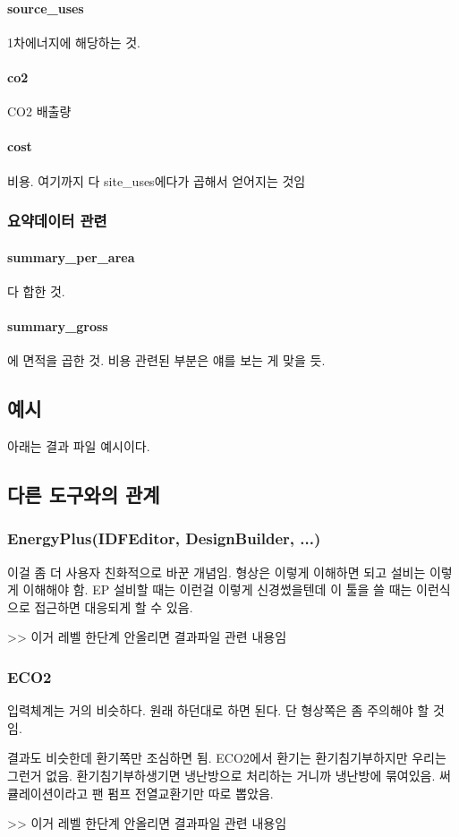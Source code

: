 \paragraph{source\_uses} 1차에너지에 해당하는 것.
\paragraph{co2} CO2 배출량
\paragraph{cost} 비용. 여기까지 다 site\_uses에다가 곱해서 얻어지는 것임

\subsubsection{요약데이터 관련}
\paragraph{summary\_per\_area} 다 합한 것.
\paragraph{summary\_gross} 에 면적을 곱한 것. 비용 관련된 부분은 얘를 보는 게 맞을 듯.

\subsection{예시}

아래는 결과 파일 예시이다.

\subsection{다른 도구와의 관계}
\subsubsection{EnergyPlus(IDFEditor, DesignBuilder, ...)}
이걸 좀 더 사용자 친화적으로 바꾼 개념임. 형상은 이렇게 이해하면 되고 설비는 이렇게 이해해야 함. EP 설비할 때는 이런걸 이렇게 신경썼을텐데 이 툴을 쓸 때는 이런식으로 접근하면 대응되게 할 수 있음.

>> 이거 레벨 한단계 안올리면 결과파일 관련 내용임

\subsubsection{ECO2}
입력체계는 거의 비슷하다. 원래 하던대로 하면 된다. 단 형상쪽은 좀 주의해야 할 것임. \par
결과도 비슷한데 환기쪽만 조심하면 됨. ECO2에서 환기는 환기침기부하지만 우리는 그런거 없음. 환기침기부하생기면 냉난방으로 처리하는 거니까 냉난방에 묶여있음. 써큘레이션이라고 팬 펌프 전열교환기만 따로 뽑았음.

>> 이거 레벨 한단계 안올리면 결과파일 관련 내용임